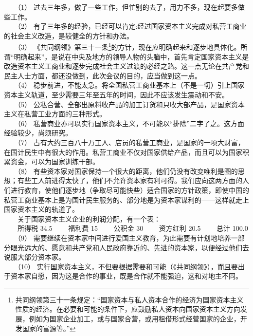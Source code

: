 \documentclass[cn,11pt,chinese]{elegantbook}
\begin{document}
　　（1） 过去三年多，做了一些工作，但忙别的去了，用力不多，现在起要多做些工作。\\
　　（2） 有了三年多的经验，已经可以肯定:经过国家资本主义完成对私营工商业的社会主义改造，是较健全的方针和办法。\\
　　（3） 《共同纲领》第三十一条\footnote[1]{ 共同纲领第三十一条规定：“国家资本与私人资本合作的经济为国家资本主义性质的经济。在必要和可能的条件下，应鼓励私人资本向国家资本主义方向发展，例如为国家企业加工，或与国家合营，或用租借形式经营国家的企业，开发国家的富源等。”}的方针，现在应明确起来和逐步地具体化。所谓“明确起来”，是说在中央及地方的领导人物的头脑中，首先肯定国家资本主义是改造资本主义工商业和逐步完成社会主义过渡的必经之路。这一点无论在共产党和民主人士方面，都还没做到，此次会议的目的，应当做到这一点。\\
　　（4） 稳步前进，不能太急。将全国私营工商业基本上（不是一切）引上国家资本主义轨道，至少需要三年至五年的时间，因此不应该发生震动和不安。\\
　　（5） 公私合营、全部出原料收产品的加工订货和只收大部产品，是国家资本主义在私营工业方面的三种形式。\\
　　（6） 私营商业亦可以实行国家资本主义，不可能以“排除”二字了之。这方面经验较少，尚须研究。\\
　　（7） 占有大约三百八十万工人、店员的私营工商业，是国家的一项大财富，在国计民生中有很大的作用。私营工商业不仅对国家供给产品，而且可以为国家积累资金，可以为国家训练干部。\\
　　（8） 有些资本家对国家保持一个很大的距离，他们仍没有改变唯利是图的思想；有些工人前进得太快了，他们不允许资本家有利可得。我们应向这两方面的人们进行教育，使他们逐步地（争取尽可能快些）适合国家的方针政策，即使中国的私营工商业基本上是为国计民生服务的、部分地是为资本家谋利的——这样就走上国家资本主义的轨道了。\\
　　关于国家资本主义企业的利润分配，有一个表：\\
　　所得税	34.5%
　　福利费	15%
　　公积金	30%
　　资方红利	20.5%
　　总计	100.0%
　　（9） 需要继续在资本家中间进行爱国主义教育，为此需要有计划地培养一部分眼光远大的、愿意和共产党和人民政府靠近的、先进的资本家，以便经过他们去说服大部分资本家。\\
　　（10） 实行国家资本主义，不但要根据需要和可能（《共同纲领》），而且要出于资本家自愿，因为这是合作的事业，既是合作就不能强迫，这和对地主不同。\\
\end{document}
